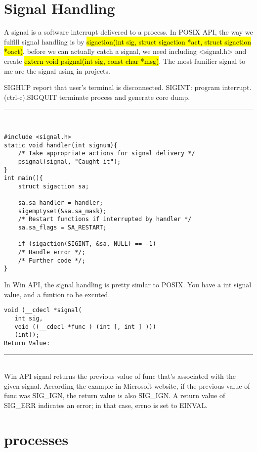 \documentclass[letterpaper,12pt,titlepage]{article}
\begin{document}
\section*{Signal Handling}
A signal is a software interrupt delivered to a process. In POSIX API, the way we fulfill signal handling is by \hl{sigaction(int sig, struct sigaction *act, struct sigaction *oact)}. before we can actually catch a signal, we need including <signal.h> and create \hl{extern void psignal(int sig, const char *msg)}. The most familier signal to me are the signal using in projects.\par
SIGHUP report that user's terminal is disconnected. SIGINT: program interrupt. (ctrl-c).SIGQUIT terminate process and generate core dump.\\
\noindent\rule{15.5cm}{0.4pt}\\
\begin{verbatim}
#include <signal.h>
static void handler(int signum){
    /* Take appropriate actions for signal delivery */ 
    psignal(signal, "Caught it"); 
} 
int main(){ 
    struct sigaction sa; 
	 
    sa.sa_handler = handler; 
    sigemptyset(&sa.sa_mask); 
    /* Restart functions if interrupted by handler */ 
    sa.sa_flags = SA_RESTART;  
	 
    if (sigaction(SIGINT, &sa, NULL) == -1) 
    /* Handle error */; 
    /* Further code */; 
} 
\end{verbatim}
In Win API, the signal handling is pretty simlar to POSIX. You have a int signal value, and a funtion to be excuted.\par
\begin{verbatim}
void (__cdecl *signal(
   int sig, 
   void ((__cdecl *func ) (int [, int ] ))) 
   (int));
Return Value:
\end{verbatim}
\noindent\rule{15.5cm}{0.4pt}\\
Win API signal returns the previous value of func that's associated with the given signal. According the example in Microsoft website, if the previous value of func was SIG\_IGN, the return value is also SIG\_IGN. A return value of SIG\_ERR indicates an error; in that case, errno is set to EINVAL.\par
\section*{processes}
\end{document}

